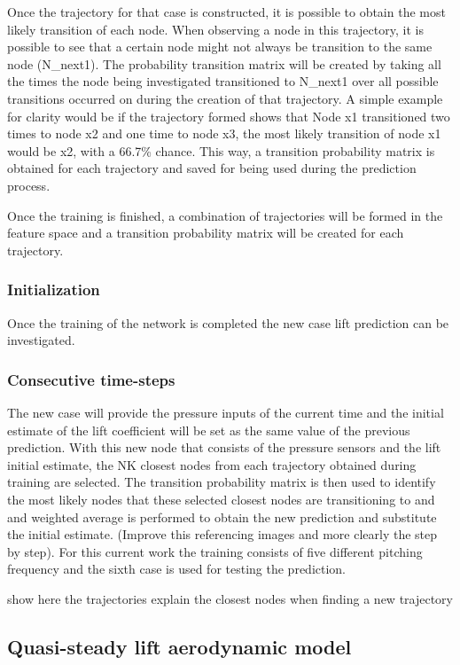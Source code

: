 \documentclass[%
 reprint,
 amsmath,amssymb,
 aps,
]{revtex4-2}
\begin{document}
Once the trajectory for that case is constructed, it is possible to obtain the most likely transition of each node.
When observing a node in this trajectory, it is possible to see that a certain node might not always be transition to the same node (N\_next1).
The probability transition matrix will be created by taking all the times the node being investigated transitioned to N\_next1 over all possible transitions occurred on during the creation of that trajectory.
A simple example for clarity would be if the trajectory formed shows that Node x1 transitioned two times to node x2 and one time to node x3, the most likely transition of node x1 would be x2, with a 66.7\% chance.
This way, a transition probability matrix is obtained for each trajectory and saved for being used during the prediction process.

Once the training is finished, a combination of trajectories will be formed in the feature space and a transition probability matrix will be created for each trajectory.

\subsubsection{Initialization}
Once the training of the network is completed the new case lift prediction can be investigated. 
\subsubsection{Consecutive time-steps}

The new case will provide the pressure inputs of the current time and the initial estimate of the lift coefficient will be set as the same value of the previous prediction. 
With this new node that consists of the pressure sensors and the lift initial estimate, the NK closest nodes from each trajectory obtained during training are selected. 
The transition probability matrix is then used to identify the most likely nodes that these selected closest nodes are transitioning to and and weighted average is performed to obtain the new prediction and substitute the initial estimate. 
(Improve this referencing images and more clearly the step by step). 
For this current work the training consists of five different pitching frequency and the sixth case is used for testing the prediction.

show here the trajectories
explain the closest nodes when finding a new trajectory

\subsection{Quasi-steady lift aerodynamic model}
\end{document}
